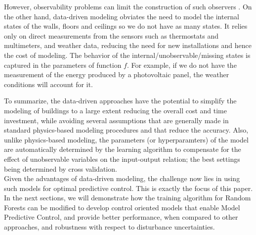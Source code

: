 \begin{enumerate}
{	However, observability problems can limit the construction of such observers \cite{Dorf2011MCS}. 
	On the other hand, data-driven modeling obviates the need to model the internal states of the walls, floors and ceilings so we do not have as many states. 
	It relies only on direct measurements from the sensors such as thermostats and multimeters, and weather data, reducing the need for new installations and hence the cost of modeling.
	The behavior of the internal/unobservable/missing states is captured in the parameters of function \(f\).
	For example, if we do not have the measurement of the energy produced by a photovoltaic panel, the weather conditions will account for it.}
\end{enumerate}

\textcolor[rgb]{0,0,1}{
	To summarize, the data-driven approaches have the potential to simplify the modeling of buildings to a large extent reducing the overall cost and time investment, while avoiding several assumptions that are generally made in standard physics-based modeling procedures and that reduce the accuracy. 
	Also, unlike physics-based modeling, the parameters (or hyperparamters) of the model are automatically determined by the learning algorithm to compensate for the effect of unobservable variables on the input-output relation; the best settings being determined by cross validation.\\
	Given the advantages of data-driven modeling, the challenge now lies in using such models for optimal predictive control.
	This is exactly the focus of this paper. 
	In the next sections, we will demonstrate how the training algorithm for Random Forests can be modified to develop control oriented models that enable Model Predictive Control, and provide better performance, when compared to other approaches, and robustness with respect to disturbance uncertainties.}